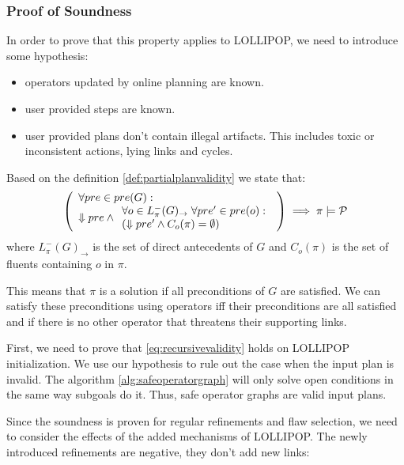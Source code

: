 \documentclass[11pt,a4paper,twoside,openright,titlepage,numbers=noenddot,headinclude,cleardoublepage=empty,openany]{scrreprt}
\theoremstyle{plain}
\theoremstyle{definition}
\theoremstyle{remark}
\providecommand{\tightlist}{%
  \setlength{\itemsep}{0pt}\setlength{\parskip}{0pt}}
\begin{document}
\hypertarget{proof-of-soundness}{%
\subsubsection{Proof of Soundness}\label{proof-of-soundness}}

In order to prove that this property applies to LOLLIPOP, we need to
introduce some hypothesis:

\begin{itemize}
\tightlist
\item
  operators updated by online planning are known.
\item
  user provided steps are known.
\item
  user provided plans don't contain illegal artifacts. This includes
  toxic or inconsistent actions, lying links and cycles.
\end{itemize}

Based on the definition \ref{def:partialplanvalidity} we state that:
\begin{equation}
\left(
\begin{array}{l}
    \forall pre \in pre(G): \\
    \Downarrow pre \land
    \begin{array}{l}
        \forall o \in L_\pi^-(G)_{\rightarrow} \thickspace \forall pre' \in pre(o): \\
        \left(\Downarrow pre'\land C_o(\pi) = \emptyset\right)
    \end{array}
\end{array}
\right) \implies \pi \models \mathcal{P}\label{eq:recursivevalidity}\end{equation}
where \(L_\pi^-(G)_{\rightarrow}\) is the set of direct antecedents of
\(G\) and \(C_o(\pi)\) is the set of fluents containing \(o\) in
\(\pi\).

This means that \(\pi\) is a solution if all preconditions of \(G\) are
satisfied. We can satisfy these preconditions using operators iff their
preconditions are all satisfied and if there is no other operator that
threatens their supporting links.

First, we need to prove that \cref{eq:recursivevalidity} holds on
LOLLIPOP initialization. We use our hypothesis to rule out the case when
the input plan is invalid. The algorithm \ref{alg:safeoperatorgraph}
will only solve open conditions in the same way subgoals do it. Thus,
safe operator graphs are valid input plans.

Since the soundness is proven for regular refinements and flaw
selection, we need to consider the effects of the added mechanisms of
LOLLIPOP. The newly introduced refinements are negative, they don't add
new links:
\end{document}
